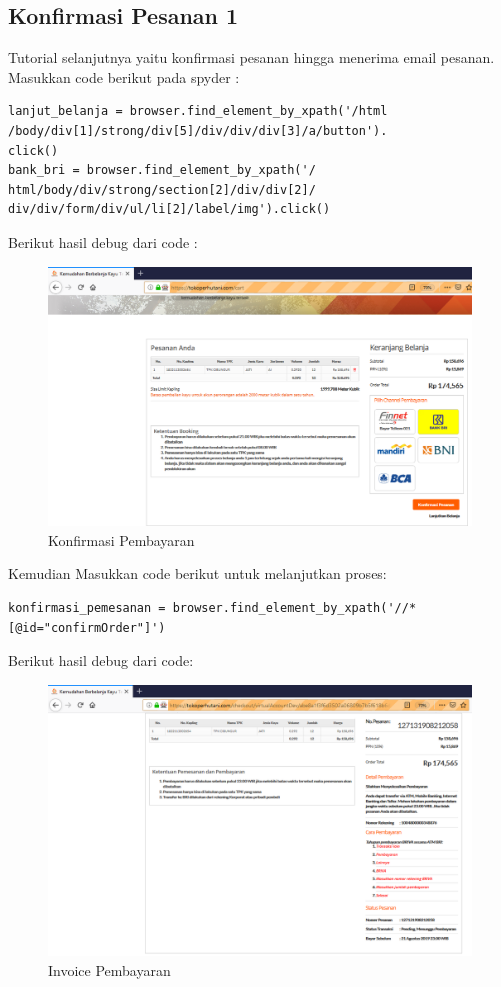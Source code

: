 \subsection{Konfirmasi Pesanan 1}
Tutorial selanjutnya yaitu konfirmasi pesanan hingga menerima email pesanan. 
Masukkan code berikut pada spyder :
\begin{verbatim}
lanjut_belanja = browser.find_element_by_xpath('/html
/body/div[1]/strong/div[5]/div/div/div[3]/a/button').
click()
bank_bri = browser.find_element_by_xpath('/
html/body/div/strong/section[2]/div/div[2]/
div/div/form/div/ul/li[2]/label/img').click()
\end{verbatim}

Berikut hasil debug dari code :
\begin{figure}[h]
 	\centering
 	\includegraphics[scale=0.29]{figures/bayar}
 	\caption{Konfirmasi Pembayaran}
\end{figure}
 
Kemudian Masukkan code berikut untuk melanjutkan proses:
\begin{verbatim}
konfirmasi_pemesanan = browser.find_element_by_xpath('//*
[@id="confirmOrder"]')
\end{verbatim}
Berikut hasil debug dari code: 
\begin{figure}[h]
	\centering
	\includegraphics[scale=0.25]{figures/invoicee}
	\caption{Invoice Pembayaran}
\end{figure}

